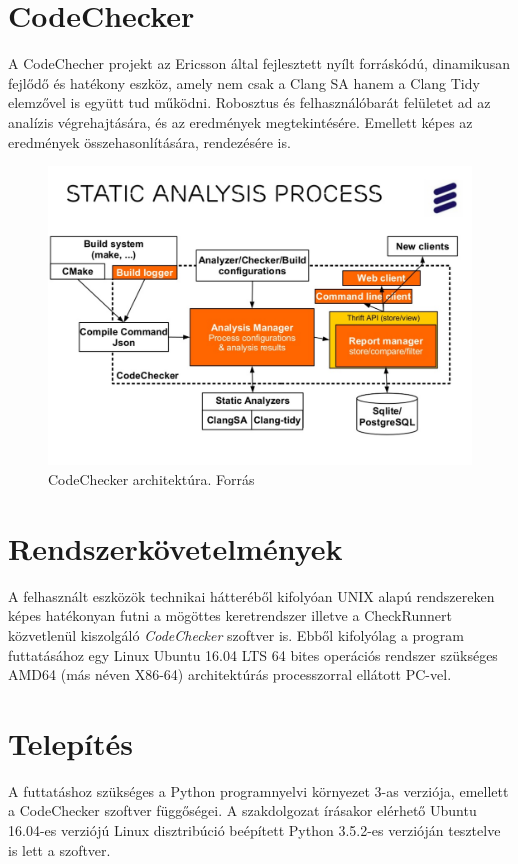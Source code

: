 \documentclass[a4paper,12pt]{report}
\begin{document}
\section{CodeChecker}
A CodeChecher projekt az Ericsson által fejlesztett nyílt forráskódú, dinamikusan fejlődő és hatékony eszköz, amely nem csak a Clang SA hanem a Clang Tidy elemzővel is együtt tud működni. Robosztus és felhasználóbarát felületet ad az analízis végrehajtására, és az eredmények megtekintésére. Emellett képes az eredmények összehasonlítására, rendezésére is.

\begin{figure}[h]
\caption{CodeChecker architektúra. Forrás \cite{codecheckerslide}}
\centering
\includegraphics[scale=0.2]{codechecker.png}
\end{figure}

\section{Rendszerkövetelmények}
A felhasznált eszközök technikai hátteréből kifolyóan UNIX alapú rendszereken képes hatékonyan futni a mögöttes keretrendszer illetve a CheckRunnert közvetlenül kiszolgáló \emph{CodeChecker} szoftver is. Ebből kifolyólag a program futtatásához egy Linux Ubuntu 16.04 LTS 64 bites operációs rendszer szükséges AMD64 (más néven X86-64) architektúrás processzorral ellátott PC-vel.

\section{Telepítés}
A futtatáshoz szükséges a Python programnyelvi környezet 3-as verziója, emellett a CodeChecker szoftver függőségei. A szakdolgozat írásakor elérhető Ubuntu 16.04-es verziójú Linux disztribúció beépített Python 3.5.2-es verzióján tesztelve is lett a szoftver.
\end{document}
